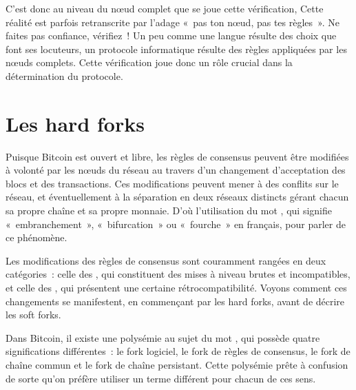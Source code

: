 C'est donc au niveau du nœud complet que se joue cette vérification, Cette réalité est parfois retranscrite par l'adage «~pas ton nœud, pas tes règles~». Ne faites pas confiance, vérifiez~! Un peu comme une langue résulte des choix que font ses locuteurs, un protocole informatique résulte des règles appliquées par les nœuds complets. Cette vérification joue donc un rôle crucial dans la détermination du protocole.

\section*{Les hard forks}

Puisque Bitcoin est ouvert et libre, les règles de consensus peuvent être modifiées à volonté par les nœuds du réseau au travers d'un changement d'acceptation des blocs et des transactions. Ces modifications peuvent mener à des conflits sur le réseau, et éventuellement à la séparation en deux réseaux distincts gérant chacun sa propre chaîne et sa propre monnaie. D'où l'utilisation du mot , qui signifie «~embranchement~», «~bifurcation~» ou «~fourche~» en français, pour parler de ce phénomène.

Les modifications des règles de consensus sont couramment rangées en deux catégories~: celle des , qui constituent des mises à niveau brutes et incompatibles, et celle des , qui présentent une certaine rétrocompatibilité. Voyons comment ces changements se manifestent, en commençant par les hard forks, avant de décrire les soft forks.

Dans Bitcoin, il existe une polysémie au sujet du mot , qui possède quatre significations différentes~: le fork logiciel, le fork de règles de consensus, le fork de chaîne commun et le fork de chaîne persistant. Cette polysémie prête à confusion de sorte qu'on préfère utiliser un terme différent pour chacun de ces sens.

